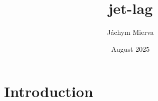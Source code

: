 \documentclass{article}
\title{jet-lag}
\author{Jáchym Mierva}
\date{August 2025}
\begin{document}
\maketitle

\section{Introduction}
\end{document}
